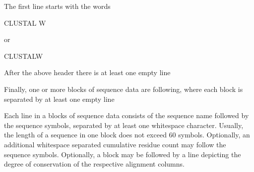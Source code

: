 \begin{DoxyItemize}
\item The first line starts with the words\begin{DoxyVerb}CLUSTAL W \end{DoxyVerb}
 or \begin{DoxyVerb}CLUSTALW \end{DoxyVerb}

\item After the above header there is at least one empty line
\item Finally, one or more blocks of sequence data are following, where each block is separated by at least one empty line
\end{DoxyItemize}Each line in a blocks of sequence data consists of the sequence name followed by the sequence symbols, separated by at least one whitespace character. Usually, the length of a sequence in one block does not exceed 60 symbols. Optionally, an additional whitespace separated cumulative residue count may follow the sequence symbols. Optionally, a block may be followed by a line depicting the degree of conservation of the respective alignment columns.

